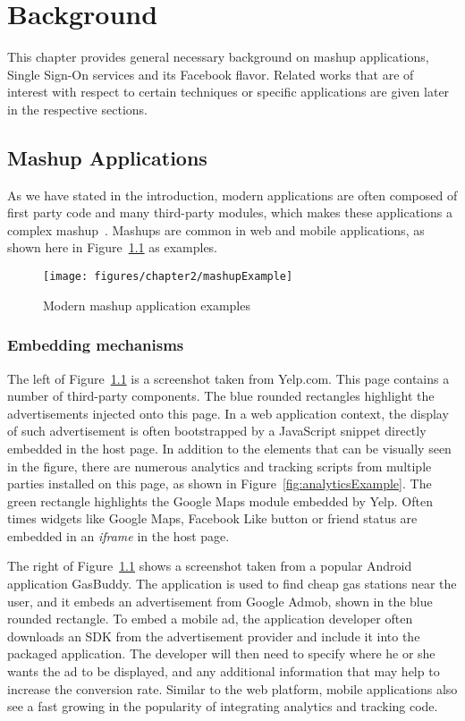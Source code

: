 \chapter{Background}

This chapter provides general necessary background on mashup applications, Single Sign-On services and its Facebook flavor.  Related works that are of interest with respect to certain techniques or specific applications are given later in the respective sections.

\section{Mashup Applications}
\label{sec:bgMashupApps}
As we have stated in the introduction, modern applications are often composed of first party code and many third-party modules, which makes these applications a complex mashup~\cite{MashupDef}.  Mashups are common in web and mobile applications, as shown here in Figure~\ref{fig:mashupExample} as examples.

\begin{figure}[bth]
\centering
\texttt{[image: figures/chapter2/mashupExample]}
\caption{Modern mashup application examples}
\label{fig:mashupExample}
\end{figure}

\subsection{Embedding mechanisms}

The left of Figure~\ref{fig:mashupExample} is a screenshot taken from Yelp.com.  This page contains a number of third-party components.  The blue rounded rectangles highlight the advertisements injected onto this page.  In a web application context, the display of such advertisement is often bootstrapped by a JavaScript snippet directly embedded in the host page.  In addition to the elements that can be visually seen in the figure, there are numerous analytics and tracking scripts from multiple parties installed on this page, as shown in Figure~\ref{fig:analyticsExample}.  The green rectangle highlights the Google Maps module embedded by Yelp.  Often times widgets like Google Maps, Facebook Like button or friend status are embedded in an \emph{iframe} in the host page.  

The right of Figure~\ref{fig:mashupExample} shows a screenshot taken from a popular Android application GasBuddy.  The application is used to find cheap gas stations near the user, and it embeds an advertisement from Google Admob, shown in the blue rounded rectangle.  To embed a mobile ad, the application developer often downloads an SDK from the advertisement provider and include it into the packaged application.  The developer will then need to specify where he or she wants the ad to be displayed, and any additional information that may help to increase the conversion rate.  Similar to the web platform, mobile applications also see a fast growing in the popularity of integrating analytics and tracking code.  


